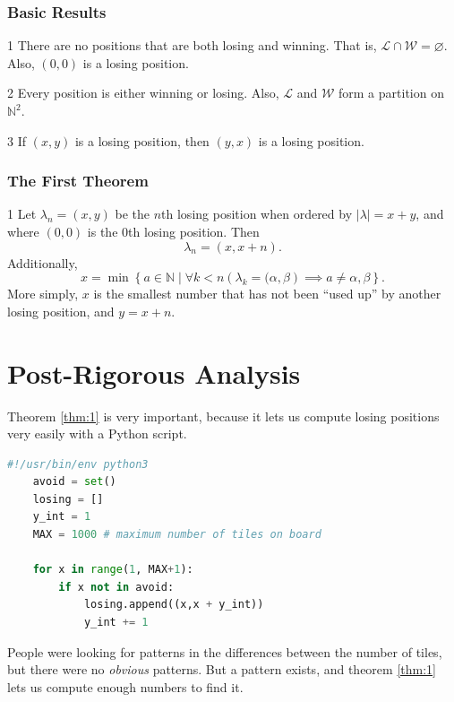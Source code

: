 \documentclass[11pt, letterpaper]{beamer}
\renewenvironment{theorem}[2]{\begin{theo}{#1}{#2}}{\end{theo}}
\newenvironment{proposition}[2]{\begin{prp}{#1}{#2}}{\end{prp}}
\begin{document}
\begin{frame}
	\frametitle{Basic Results}
	\pause
	\begin{proposition}{}{1}
		There are no positions that are both losing and winning. That is, $\mathcal{L} \cap \mathcal{W} =\varnothing$. Also, $(0,0)$ is a losing position.
	\end{proposition}
	\pause
	\begin{proposition}{}{2}
		Every position is either winning or losing. Also, $\mathcal{L} $ and $\mathcal{W} $ form a partition on $\mathbb{N}^2$.
	\end{proposition}
	\pause
	\begin{proposition}{}{3}
		If $(x,y)$ is a losing position, then $(y,x)$ is a losing position.
	\end{proposition}
\end{frame}

\begin{frame}
	\frametitle{The First Theorem}
	\begin{theorem}{}{1}
		Let $\lambda_n=(x,y)$ be the $n$th losing position when ordered by $\left| \lambda  \right|=x+y $, and where $(0,0)$ is the $0$th losing position. Then
		\[
			\lambda_n =(x,x+n)
		.\]
		Additionally,
		\[
			x=\min \left\{ a\in\mathbb{N} \mid \forall k<n\left( \lambda_k=(\alpha ,\beta  \right) \implies a\neq \alpha,\beta   \right\} 
		.\]
		More simply, $x$ is the smallest number that has not been ``used up'' by another losing position, and $y=x+n$.
	\end{theorem}
\end{frame}

\section{Post-Rigorous Analysis}

\begin{frame}[fragile]
	Theorem \ref{thm:1} is very important, because it lets us compute losing positions very easily with a Python script.
	\begin{lstlisting}[language=Python]
	#!/usr/bin/env python3
	avoid = set()
	losing = []
	y_int = 1
	MAX = 1000 # maximum number of tiles on board

	for x in range(1, MAX+1):
		if x not in avoid:
			losing.append((x,x + y_int))
			y_int += 1
	\end{lstlisting}\pause
	People were looking for patterns in the differences between the number of tiles, but there were no \emph{obvious} patterns. But a pattern exists, and theorem \ref{thm:1} lets us compute enough numbers to find it.
\end{frame}
\end{document}

